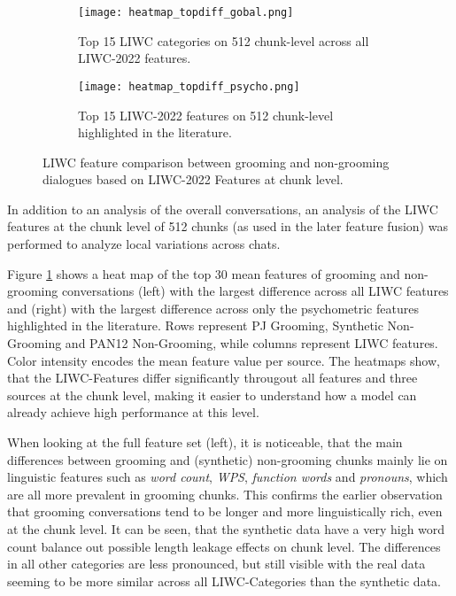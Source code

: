 
\begin{figure}[ht]
    \centering
    \begin{subfigure}[t]{0.49\textwidth}
        \centering
        \texttt{[image: heatmap\_topdiff\_gobal.png]}
        \caption{Top 15 LIWC categories on 512 chunk-level across all LIWC-2022 features.}
    \end{subfigure}
    \hfill
    \begin{subfigure}[t]{0.49\textwidth}
        \centering
        \texttt{[image: heatmap\_topdiff\_psycho.png]}
        \caption{Top 15 LIWC-2022 features on 512 chunk-level highlighted in the literature.}
    \end{subfigure}
    \caption[LIWC Feature Comparison at Chunk Level]{LIWC feature comparison between grooming and non-grooming dialogues based on LIWC-2022 Features at chunk level.}
    \label{fig:liwc_chunked_analysis}
\end{figure}

In addition to an analysis of the overall conversations, an analysis of the LIWC features at the chunk level of 512 chunks (as used in the later feature fusion) was performed to analyze local variations across chats. 

Figure \ref{fig:liwc_chunked_analysis} shows a heat map of the top 30 mean features of grooming and non-grooming conversations (left) with the largest difference across all LIWC features and (right) with the largest difference across only the psychometric features highlighted in the literature. Rows represent PJ Grooming, Synthetic Non-Grooming and PAN12 Non-Grooming, while columns represent LIWC features. Color intensity encodes the mean feature value per source. The heatmaps show, that the LIWC-Features differ significantly througout all features and three sources at the chunk level, making it easier to understand how a model can already achieve high performance at this level.

When looking at the full feature set (left), it is noticeable, that the main differences between grooming and (synthetic) non-grooming chunks mainly lie on linguistic features such as \textit{word count}, \textit{WPS}, \textit{function words} and \textit{pronouns}, which are all more prevalent in grooming chunks. This confirms the earlier observation that grooming conversations tend to be longer and more linguistically rich, even at the chunk level. It can be seen, that the synthetic data have a very high word count balance out possible length leakage effects on chunk level. The differences in all other categories are less pronounced, but still visible with the real data seeming to be more similar across all LIWC-Categories than the synthetic data. 

